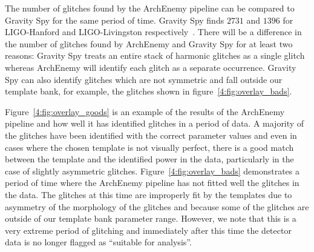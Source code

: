 The number of \scl{} glitches found by the ArchEnemy pipeline can be compared to Gravity Spy for the same period of time. Gravity Spy finds $2731$ and $1396$ for LIGO-Hanford and LIGO-Livingston respectively~\cite{gravityspy:2023}. There will be a difference in the number of glitches found by ArchEnemy and Gravity Spy for at least two reasons: Gravity Spy treats an entire stack of harmonic glitches as a single \scl{} glitch whereas ArchEnemy will identify each glitch as a separate occurrence. Gravity Spy can also identify \scl{} glitches which are not symmetric and fall outside our template bank, for example, the \scl{} glitches shown in figure~\ref{4:fig:overlay_bads}.

Figure~\ref{4:fig:overlay_goods} is an example of the results of the ArchEnemy pipeline and how well it has identified \scl{} glitches in a period of data. A majority of the glitches have been identified with the correct parameter values and even in cases where the chosen template is not visually perfect, there is a good match between the template and the identified power in the data, particularly in the case of slightly asymmetric glitches. Figure~\ref{4:fig:overlay_bads} demonstrates a period of time where the ArchEnemy pipeline has not fitted well the \scl{} glitches in the data. The glitches at this time are improperly fit by the templates due to asymmetry of the morphology of the glitches and because some of the glitches are outside of our template bank parameter range. However, we note that this is a very extreme period of \scl{} glitching and immediately after this time the detector data is no longer flagged as ``suitable for analysis''.

